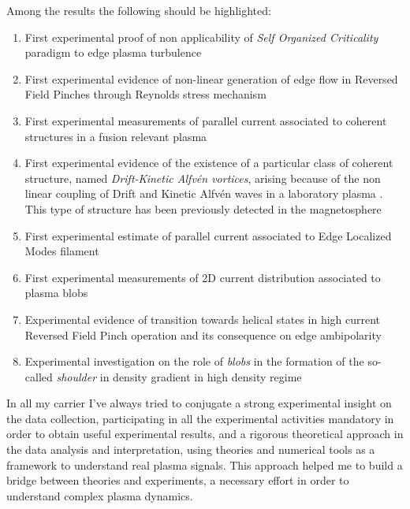 {Among the results the following should be highlighted:
\begin{enumerate}[itemsep=0.05ex, label=\textbf{\roman*}]
\item First experimental proof of non applicability of \emph{Self
    Organized Criticality} paradigm to edge plasma
  turbulence \parencite{Spada:2001p3574,Antoni:2001p3221}
\item First experimental evidence of non-linear generation of edge
  flow in Reversed Field Pinches through Reynolds stress
  mechanism \parencite{Vianello:2005p1976,Vianello:2005p2671}
\item First experimental measurements of parallel current associated
   to coherent structures in a fusion relevant
   plasma \parencite{Spolaore:2009p4115} 
\item First experimental evidence of the existence of a particular 
  class of coherent structure, named \emph{Drift-Kinetic Alfv\'en
    vortices}, arising because of the non linear coupling of Drift and
  Kinetic Alfv\'en waves in a laboratory plasma \parencite{Vianello:2010p4670}. This type of structure has been
  previously detected in the magnetosphere
\item First experimental estimate of parallel current associated to
   Edge Localized Modes filament \parencite{PhysRevLett.106.125002}
\item First experimental measurements of 2D current distribution
associated to plasma blobs \parencite{Furno:2011cs}
\item Experimental evidence of transition towards helical states in
high current Reversed Field Pinch
operation \parencite{Lorenzini:2009p4248} and its consequence on edge
ambipolarity \parencite{Spizzo:2014jn}
\item Experimental investigation on the role of \emph{blobs} in the
  formation of the so-called \emph{shoulder} in density gradient in
  high density regime \parencite{Carralero:prl2015}
\end{enumerate}
In all my carrier I've always tried to conjugate a strong experimental
insight on the data collection, participating in all the experimental
activities mandatory in order to obtain useful experimental results, and a rigorous theoretical approach in
the data analysis and interpretation, using theories and numerical
tools as a framework to understand real plasma signals. This
approach helped me to build a bridge between theories and experiments,
a necessary effort in order to understand complex plasma dynamics.

\printbibliography[type=article,  title = {Cited publications}, heading=subbibliography, prefixnumbers={A}, resetnumbers=true]
}
